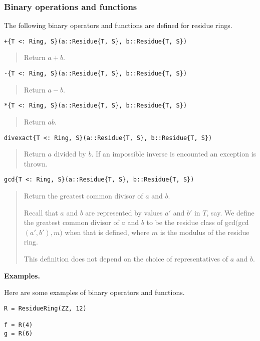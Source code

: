 \documentclass[a4paper,10pt]{article}
\newcommand{\desc}[1]{\vspace{-3mm}\begin{quote}#1\end{quote}}
\begin{document}
{{{\subsubsection{Binary operations and functions}

The following binary operators and functions are defined for residue rings.

\begin{lstlisting}
+{T <: Ring, S}(a::Residue{T, S}, b::Residue{T, S})
\end{lstlisting}

\desc{Return $a + b$.}

\begin{lstlisting}
-{T <: Ring, S}(a::Residue{T, S}, b::Residue{T, S})
\end{lstlisting}

\desc{Return $a - b$.}

\begin{lstlisting}
*{T <: Ring, S}(a::Residue{T, S}, b::Residue{T, S})
\end{lstlisting}

\desc{Return $ab$.}

\begin{lstlisting}
divexact{T <: Ring, S}(a::Residue{T, S}, b::Residue{T, S})
\end{lstlisting}

\desc{Return $a$ divided by $b$. If an impossible inverse is encounted
an exception is thrown.}

\begin{lstlisting}
gcd{T <: Ring, S}(a::Residue{T, S}, b::Residue{T, S})
\end{lstlisting}

\desc{Return the greatest common divisor of $a$ and $b$. 

Recall that $a$ and $b$ are represented by values $a'$ and $b'$ in $T$, 
say. We define the greatest common divisor of $a$ and $b$ to be the 
residue class of gcd$($gcd$(a', b'), m)$ when that is defined, where 
$m$ is the modulus of the residue ring.

This definition does not depend on the choice of representatives of
$a$ and $b$.}

\textbf{Examples.}

Here are some examples of binary operators and functions.

\begin{lstlisting}
R = ResidueRing(ZZ, 12)

f = R(4)
g = R(6)


\end{lstlisting}}}}
\end{document}
